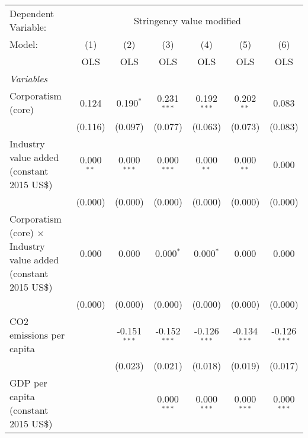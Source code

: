 
\begingroup
\centering
\begin{tabular}{lcccccc}
   \toprule
   Dependent Variable: & \multicolumn{6}{c}{Stringency value modified}\\
   Model:                                                                  & (1)          & (2)            & (3)            & (4)            & (5)            & (6)\\  
                                                                           &  OLS         & OLS            & OLS            & OLS            & OLS            & OLS\\  
   \midrule
   \emph{Variables}\\
   Corporatism (core)                                                      & 0.124        & 0.190$^{*}$    & 0.231$^{***}$  & 0.192$^{***}$  & 0.202$^{**}$   & 0.083\\   
                                                                           & (0.116)      & (0.097)        & (0.077)        & (0.063)        & (0.073)        & (0.083)\\   
   Industry value added (constant 2015 US\$)                               & 0.000$^{**}$ & 0.000$^{***}$  & 0.000$^{***}$  & 0.000$^{**}$   & 0.000$^{**}$   & 0.000\\   
                                                                           & (0.000)      & (0.000)        & (0.000)        & (0.000)        & (0.000)        & (0.000)\\   
   Corporatism (core) $\times$ Industry value added (constant 2015 US\$)   & 0.000        & 0.000          & 0.000$^{*}$    & 0.000$^{*}$    & 0.000          & 0.000\\   
                                                                           & (0.000)      & (0.000)        & (0.000)        & (0.000)        & (0.000)        & (0.000)\\   
   CO2 emissions per capita                                                &              & -0.151$^{***}$ & -0.152$^{***}$ & -0.126$^{***}$ & -0.134$^{***}$ & -0.126$^{***}$\\   
                                                                           &              & (0.023)        & (0.021)        & (0.018)        & (0.019)        & (0.017)\\   
   GDP per capita (constant 2015 US\$)                                     &              &                & 0.000$^{***}$  & 0.000$^{***}$  & 0.000$^{***}$  & 0.000$^{***}$\\   

\end{tabular}

